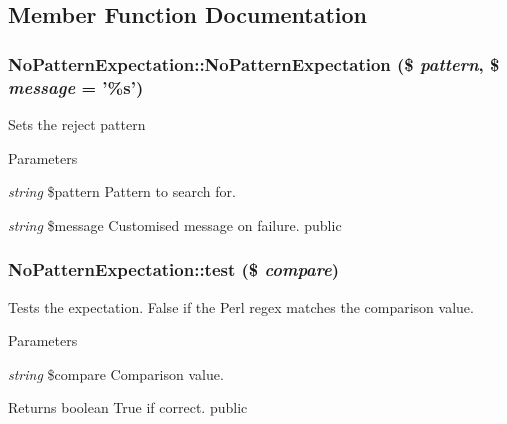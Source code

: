 \subsection{Member Function Documentation}
\hypertarget{class_no_pattern_expectation_a01392fb76654440c039cc272fc752017}{
\subsubsection[{NoPatternExpectation}]{\setlength{\rightskip}{0pt plus 5cm}NoPatternExpectation::NoPatternExpectation (\$ {\em pattern}, \/  \$ {\em message} = {\ttfamily '\%s'})}}
\label{class_no_pattern_expectation_a01392fb76654440c039cc272fc752017}
Sets the reject pattern 
\begin{DoxyParams}{Parameters}
\item[{\em string}]\$pattern Pattern to search for. \item[{\em string}]\$message Customised message on failure.  public \end{DoxyParams}
\hypertarget{class_no_pattern_expectation_adea22650021fb33f1d745aba552e6971}{
\subsubsection[{test}]{\setlength{\rightskip}{0pt plus 5cm}NoPatternExpectation::test (\$ {\em compare})}}
\label{class_no_pattern_expectation_adea22650021fb33f1d745aba552e6971}
Tests the expectation. False if the Perl regex matches the comparison value. 
\begin{DoxyParams}{Parameters}
\item[{\em string}]\$compare Comparison value. \end{DoxyParams}
\begin{DoxyReturn}{Returns}
boolean True if correct.  public 
\end{DoxyReturn}


